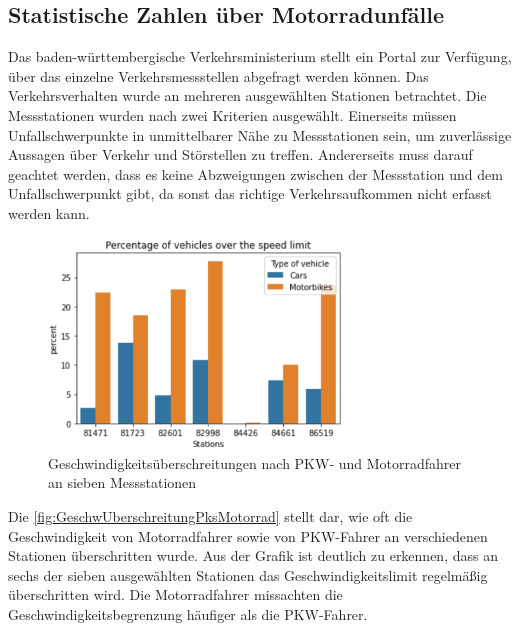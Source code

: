 \subsection{Statistische Zahlen über Motorradunfälle}
Das baden-württembergische Verkehrsministerium stellt ein Portal zur Verfügung, über das einzelne Verkehrsmessstellen abgefragt werden können. Das Verkehrsverhalten wurde an mehreren ausgewählten Stationen betrachtet. Die Messstationen wurden nach zwei Kriterien ausgewählt. Einerseits müssen Unfallschwerpunkte in unmittelbarer Nähe zu Messstationen sein, um zuverlässige Aussagen über Verkehr und Störstellen zu treffen.
Andererseits muss darauf geachtet werden, dass es keine Abzweigungen zwischen der Messstation und dem Unfallschwerpunkt gibt, da sonst das richtige Verkehrsaufkommen nicht erfasst werden kann.
\begin{figure}[htpb]
	\centering
	\includegraphics[width=0.7\textwidth]{Bilder/GeschwUberschreitungPksMotorrad.png}
	\caption{Geschwindigkeitsüberschreitungen nach PKW- und Motorradfahrer an sieben Messstationen\citep{Maire2020}}
	\label{fig:GeschwUberschreitungPksMotorrad}
\end{figure}

Die \autoref{fig:GeschwUberschreitungPksMotorrad} stellt dar, wie oft die Geschwindigkeit von Motorradfahrer sowie von PKW-Fahrer an verschiedenen Stationen überschritten wurde. Aus der Grafik ist deutlich zu erkennen, dass an sechs der sieben ausgewählten Stationen das Geschwindigkeitslimit regelmäßig überschritten wird.
Die Motorradfahrer missachten die Geschwindigkeitsbegrenzung häufiger als die PKW-Fahrer. \citep{Maire2020}

